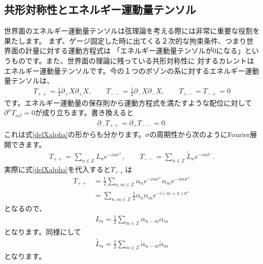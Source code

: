 \documentclass[report,paper=a4, fontsize=12pt, line_length=16cm, number_of_lines=34,dvipdfmx]{jlreq}
\numberwithin{equation}{chapter}
\numberwithin{equation}{section}
\newcommand{\Zb}{\mathbb{Z}}
\newcommand{\del}{\partial}
\newcommand{\alphat}{\tilde{\alpha}}
\newcommand{\Lt}{\widetilde{L}}
\begin{document}
\subsection{共形対称性とエネルギー運動量テンソル}
世界面のエネルギー運動量テンソルは弦理論を考える際には非常に重要な役割を果たします。
まず、ゲージ固定した時に出てくる２次的な拘束条件、つまり世界面の計量に対する運動方程式は
「エネルギー運動量テンソルが$0$になる」というものです。また、世界面の理論に残っている共形対称性に
対するカレントはエネルギー運動量テンソルです。今の１つのボゾンの系に対するエネルギー運動量テンソルは、
\begin{align}
T_{++}=\frac12 \del_{+}X\del_{+}X,\qquad
T_{--}=\frac12 \del_{-}X\del_{-}X,\qquad
T_{+-}=T_{-+}=0\label{free-scalar-EM}
\end{align}
です。エネルギー運動量の保存則から運動方程式を満たすような配位に対して$\del^{\alpha}T_{\alpha\beta}=0$が成り立ちます。書き換えると
\begin{align}
\del_{-}T_{++}=\del_{+}T_{--}=0.
\end{align}
これは式\eqref{delXalpha}の形からも分かります。$\sigma$の周期性から次のようにFourier展開できます。
\begin{align}
T_{++}=\sum_{n\in\Zb}L_{n}e^{-in\sigma^{+}},\qquad
T_{--}=\sum_{n\in\Zb}\Lt_{n}e^{-in\sigma^{-}}.
\end{align}
実際に式\eqref{delXalpha}を代入すると$T_{++}$は
\begin{align}
T_{++}&=\frac12 \sum_{n,m\in\Zb}\alpha_n e^{-in\sigma^{+}}\alpha_m e^{-im\sigma^{+}}\\
&=\sum_{n,m\in\Zb}\frac12 \alpha_n\alpha_m e^{-i(m+n)\sigma^{+}}
\end{align}
となるので、
\begin{align}
L_{n}=\frac12 \sum_{m\in\Zb} \alpha_{n-m}\alpha_{m}
\end{align}
となります。同様にして
\begin{align}
\Lt_{n}=\frac12 \sum_{m\in\Zb} \alphat_{n-m}\alphat_{m}
\end{align}
となります。
\end{document}
